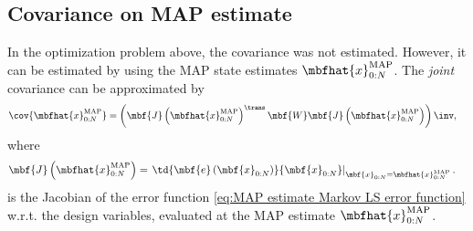 \subsection{Covariance on MAP estimate}
In the optimization problem above, the covariance was not estimated. However, it can be estimated by using the MAP state estimates $\mbfhat{x}^{\mathrm{MAP}}_{0:N}$. The \emph{joint} covariance can be approximated by
\begin{align}
    \cov{\mbfhat{x}_{0:N}^{\mathrm{MAP}}} &=
    \left( \mbf{J}\left(\mbfhat{x}_{0:N}^{\mathrm{MAP}}\right)^{\trans}\mbf{W}\mbf{J}\left(\mbfhat{x}_{0:N}^{\mathrm{MAP}}\right) \right)\inv,
\end{align}
where 
\begin{align}
    \mbf{J}\left(\mbfhat{x}_{0:N}^{\mathrm{MAP}}\right) &= 
    \left. \td{\mbf{e}\left( \mbf{x}_{0:N} \right)}{\mbf{x}_{0:N}}\right|_{\mbf{x}_{0:N}=\mbfhat{x}_{0:N}^{\mathrm{MAP}}}.
\end{align}
is the Jacobian of the error function \eqref{eq:MAP estimate Markov LS error function} w.r.t. the design variables, evaluated at the MAP estimate $\mbfhat{x}_{0:N}^{\mathrm{MAP}}$.

